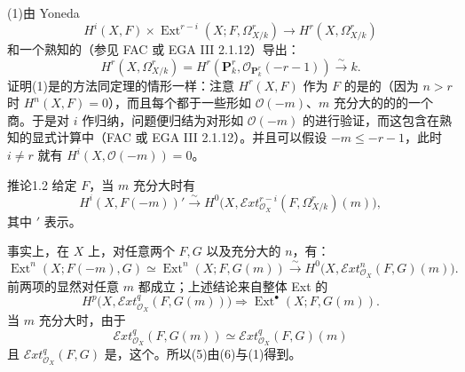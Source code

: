 (1)由 Yoneda 
\[
 H^i(X,F)\times\operatorname{Ext}^{r-i}(X;F,\Omega^r_{X/k})\longrightarrow H^r(X,\Omega^r_{X/k})\tag{3}
\]
和一个熟知的（参见 FAC 或 EGA III 2.1.12）导出：
\[
 H^r(X,\Omega^r_{X/k})=H^r(\mathbf P_k^r,\mathcal O_{\mathbf P_k^r}(-r-1))\xrightarrow{\sim}k.\tag{4}
\]
证明(1)是的方法同定理的情形一样：注意 $H^r(X,F)$ 作为 $F$ 的是的（因为 $n>r$ 时 $H^n(X,F)=0$），而且每个都于一些形如 $\mathcal O(-m)$、$m$ 充分大的的的一个商。于是对 $i$ 作归纳，问题便归结为对形如 $\mathcal O(-m)$ 的进行验证，而这包含在熟知的显式计算中（FAC 或 EGA III 2.1.12）。并且可以假设 $-m\leq-r-1$，此时 $i\neq r$ 就有 $H^i(X,\mathcal O(-m))=0$。
\begin{SGAresult}{推论}{1.2}
给定 $F$，当 $m$ 充分大时有
\[
 H^i(X,F(-m))'\xrightarrow{\sim}H^0\bigl(X,\mathcal Ext^{r-i}_{\mathcal O_X}(F,\Omega^r_{X/k})(m)\bigr),\tag{5}
\]
其中 $'$ 表示。
\end{SGAresult}
事实上，在 $X$ 上，对任意两个 $F,G$ 以及充分大的 $n$，有：
\[
 \operatorname{Ext}^n(X;F(-m),G)\simeq\operatorname{Ext}^n(X;F,G(m))
 \xrightarrow{\sim}H^0\bigl(X,\mathcal Ext^n_{\mathcal O_X}(F,G)(m)\bigr).\tag{6}
\]
前两项的显然对任意 $m$ 都成立；上述结论来自整体 Ext 的
\[
 H^p\bigl(X,\mathcal Ext^q_{\mathcal O_X}(F,G(m))\bigr)\Longrightarrow\operatorname{Ext}^{\bullet}(X;F,G(m)).
\]
当 $m$ 充分大时，由于
\[
 \mathcal Ext^q_{\mathcal O_X}(F,G(m))\simeq\mathcal Ext^q_{\mathcal O_X}(F,G)(m)
\]
且 $\mathcal Ext^q_{\mathcal O_X}(F,G)$ 是，这个。所以(5)由(6)与(1)得到。
